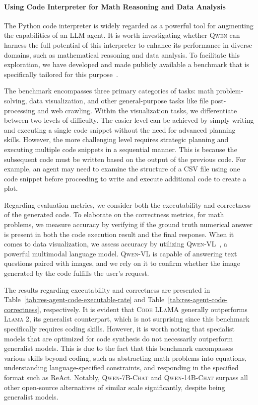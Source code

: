 \paragraph{Using Code Interpreter for Math Reasoning and Data Analysis}

The Python code interpreter is widely regarded as a powerful tool for augmenting the capabilities of an LLM agent. It is worth investigating whether \textsc{Qwen} can harness the full potential of this interpreter to enhance its performance in diverse domains, such as mathematical reasoning and data analysis. To facilitate this exploration, we have developed and made publicly available a benchmark that is specifically tailored for this purpose~\citep[see][]{qwen-code-interpreter-eval}.

The benchmark encompasses three primary categories of tasks: math problem-solving, data visualization, and other general-purpose tasks like file post-processing and web crawling. Within the visualization tasks, we differentiate between two levels of difficulty. The easier level can be achieved by simply writing and executing a single code snippet without the need for advanced planning skills. However, the more challenging level requires strategic planning and executing multiple code snippets in a sequential manner. This is because the subsequent code must be written based on the output of the previous code. For example, an agent may need to examine the structure of a CSV file using one code snippet before proceeding to write and execute additional code to create a plot.

Regarding evaluation metrics, we consider both the executability and correctness of the generated code. To elaborate on the correctness metrics, for math problems, we measure accuracy by verifying if the ground truth numerical answer is present in both the code execution result and the final response. When it comes to data visualization, we assess accuracy by utilizing \textsc{Qwen}\textsc{-VL}~\citep{qwenvl}, a powerful multimodal language model. \textsc{Qwen}\textsc{-VL} is capable of answering text questions paired with images, and we rely on it to confirm whether the image generated by the code fulfills the user's request.

The results regarding executability and correctness are presented in Table~\ref{tab:res-agent-code-executable-rate} and Table~\ref{tab:res-agent-code-correctness}, respectively. It is evident that \textsc{Code LLaMA} generally outperforms \textsc{Llama 2}, its generalist counterpart, which is not surprising since this benchmark specifically requires coding skills. However, it is worth noting that specialist models that are optimized for code synthesis do not necessarily outperform generalist models. This is due to the fact that this benchmark encompasses various skills beyond coding, such as abstracting math problems into equations, understanding language-specified constraints, and responding in the specified format such as ReAct. Notably, \textsc{Qwen-7B-Chat} and \textsc{Qwen-14B-Chat} surpass all other open-source alternatives of similar scale significantly, despite being generalist models.

